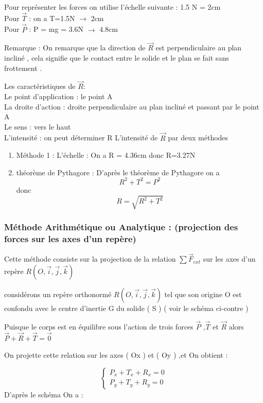 \documentclass[12pt]{article}
\begin{document}
Pour représenter les forces on utilise l’échelle suivante : 1.5 N = 2cm
\\Pour $\vec{T}$ : on a  T=1.5N $\rightarrow$ 2cm
\\Pour $\vec{P}$ : P = mg = 3.6N $\rightarrow$ 4.8cm

Remarque : On remarque que la direction de $\vec{R}$ est perpendiculaire au plan incliné  , cela signifie que le contact entre le solide et le plan se fait sans frottement .

Les caractéristiques de $\vec{R} : $
\\Le point d’application : le point A
\\La droite d’action : droite perpendiculaire au plan incliné et passant par le point A
\\Le sens : vers le haut
\\L’intensité : on peut déterminer R L’intensité de $\vec{R}$ par deux méthodes 
\begin{enumerate}
  \item Méthode 1 : L’échelle : On a R = 4.36cm donc R=3.27N
  \item théorème de Pythagore : D’après le théorème de Pythagore on a  $$R^2 + T^2 = P^2$$
    donc $$R = \sqrt{R^2 + T^2}$$
\end{enumerate}

\subsubsection{Méthode Arithmétique ou Analytique : (projection des forces sur les axes d’un repère)}

Cette méthode consiste sur la projection de la relation $\sum{\vec{F}_{ext}}$ sur les axes d’un repère $ R(O, \vec{i}, \vec{j}, \vec{k})$

considérons un repère orthonormé $ R(O, \vec{i}, \vec{j}, \vec{k})$ tel que son origine O est confondu avec le centre d’inertie G
du solide ( S ) ( voir le schéma ci-contre )

Puisque le corps est en équilibre sous l’action de trois forces $\vec{P}$ ,$\vec{T}$ et $\vec{R}$ 
alors  $\vec{P} + \vec{R} + \vec{T} = \vec{0}$

On projette cette relation sur les axes ( Ox ) et ( Oy ) ,et On obtient :

$$\begin{cases}
  P_x + T_x + R_x = 0\\
  P_y + T_y + R_y = 0
\end{cases}
$$
D’après le schéma On a : 
\end{document}
